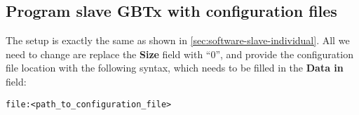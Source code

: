 \subsection{Program slave GBTx with configuration files}
The setup is exactly the same as shown in
\autoref{sec:software-slave-individual}.
All we need to change are replace the \textbf{Size} field with ``0'', and
provide the configuration file location with the following syntax, which needs
to be filled in the \textbf{Data in} field:

\begin{verbatim}
file:<path_to_configuration_file>
\end{verbatim}
